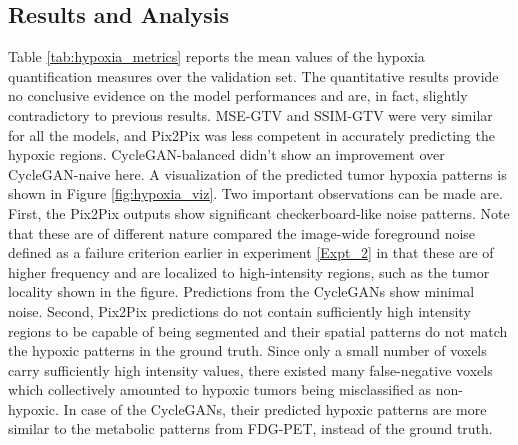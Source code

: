 \subsection{Results and Analysis}
Table \ref{tab:hypoxia_metrics} reports the mean values of the hypoxia quantification measures over the validation set. The quantitative results provide no conclusive evidence on the model performances and are, in fact, slightly contradictory to previous results. MSE-GTV and SSIM-GTV were very similar for all the models, and Pix2Pix was less competent in accurately predicting the hypoxic regions. CycleGAN-balanced didn't show an improvement over CycleGAN-naive here. A visualization of the predicted tumor hypoxia patterns is shown in Figure \ref{fig:hypoxia_viz}. Two important observations can be made are. First, the Pix2Pix outputs show significant checkerboard-like noise patterns. Note that these are of different nature compared the image-wide foreground noise defined as a failure criterion earlier in experiment \ref{Expt_2} in that these are of higher frequency and are localized to high-intensity regions, such as the tumor locality shown in the figure. Predictions from the CycleGANs show minimal noise. Second, Pix2Pix predictions do not contain sufficiently high intensity regions to be capable of being segmented and their spatial patterns do not match the hypoxic patterns in the ground truth. Since only a small number of voxels carry sufficiently high intensity values, there existed many false-negative voxels which collectively amounted to hypoxic tumors being misclassified as non-hypoxic. In case of the CycleGANs, their predicted hypoxic patterns are more similar to the metabolic patterns from FDG-PET, instead of the ground truth.


